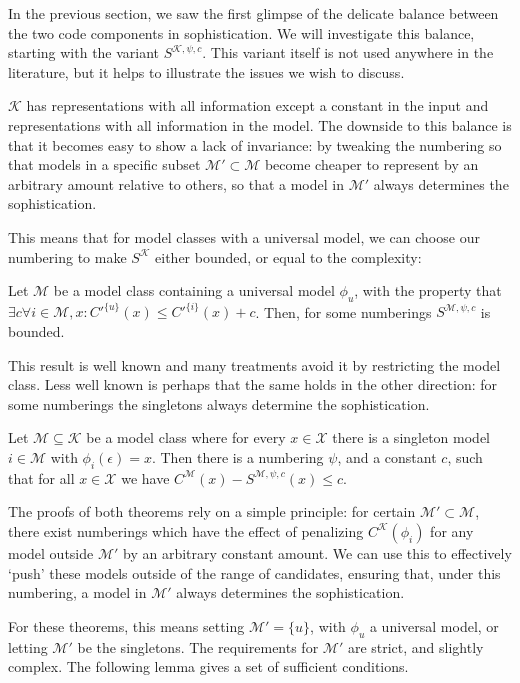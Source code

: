 \documentclass{style/llncs}
\newcommand{\M}{\mathscr M}
\newcommand{\K}{\mathscr K}
\newcommand{\X}{\mathscr X}
\newcommand{\s}{S}
\begin{document}
In the previous section, we saw the first glimpse of the delicate balance between the two code components in sophistication. We will investigate this balance, starting with the variant $\s^{\K,\psi,c}$. This variant itself is not used anywhere in the literature, but it helps to illustrate the issues we wish to discuss.

$\K$ has representations with all information except a constant in the input and representations with all information in the model. The downside to this balance is that it becomes easy to show a lack of invariance: by tweaking the numbering so that models in a specific subset $\M'\subset\M$ become cheaper to represent by an arbitrary amount relative to others, so that a model in $\M'$ always determines the sophistication.

This means that for model classes with a universal model, we can choose our numbering to make $S^\K$ either bounded, or equal to the complexity:

\begin{theorem}[Underfitting]
Let $\M$ be a model class containing a universal model $\phi_u$, with the property that $\exists c \forall i \in \M, x : C'^{\{u\}}(x) \leq C'^{\{i\}}(x) + c$. Then, for some numberings $\s^{\M,\psi,c}$ is bounded. \label{theorem:underfitting}
\end{theorem}

This result is well known and many treatments avoid it by restricting the model class. Less well known is perhaps that the same holds in the other direction: for some numberings the singletons always determine the sophistication. 

\begin{theorem}[Overfitting]
Let $\M \subseteq \K$ be a model class where for every $x\in\X$ there is a singleton model $i\in\M$ with $\phi_i(\epsilon)=x$. Then there is a numbering $\psi$, and a constant $c$, such that for all $x\in\X$ we have $C^\M(x)-S^{\M,\psi,c}(x)\leq c$.\label{theorem:overfitting}
\end{theorem}
The proofs of both theorems rely on a simple principle: for certain $\M' \subset \M$, there exist numberings which have the effect of penalizing $C^\K(\phi_i)$ for any model outside $\M'$ by an arbitrary constant amount. We can use this to effectively `push' these models outside of the range of candidates, ensuring that, under this numbering, a model in $\M'$ always determines the sophistication.

For these theorems, this means setting $\M' = \{u\}$, with $\phi_u$ a universal model, or letting $\M'$ be the singletons. The requirements for $\M'$ are strict, and slightly complex. The following lemma gives a set of sufficient conditions.
\end{document}
